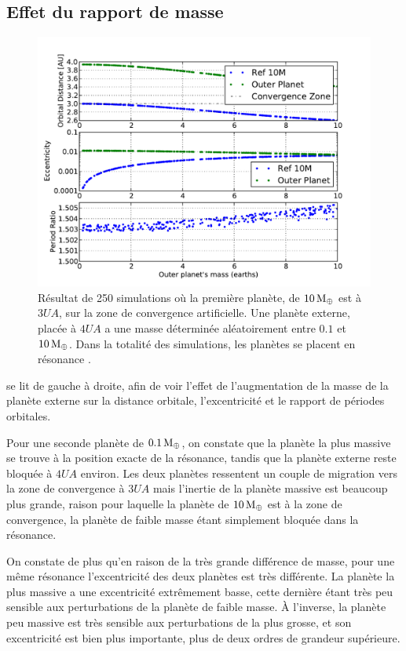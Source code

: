 \subsection{Effet du rapport de masse}
\begin{figure}[htb]
\centering
\includegraphics[width=0.75\linewidth]{figure/MMR_mass_ratio.pdf}
\caption{Résultat de 250 simulations où la première planète, de $10\mathrm{\thinspace M_\oplus}$ est à $3\unit{UA}$, sur
la zone de convergence artificielle. Une planète externe, placée à $4\unit{UA}$ a une masse
déterminée aléatoirement entre $0.1$ et $10\mathrm{\thinspace M_\oplus}$. Dans la totalité des simulations, les planètes
se placent en résonance .}\label{fig:MMR_mass_ratio}
\end{figure}

 se lit de gauche à droite, afin de voir l'effet de l'augmentation de la masse de la planète externe
sur la distance orbitale, l'excentricité et le rapport de périodes orbitales. 

Pour une seconde planète de $0.1\mathrm{\thinspace M_\oplus}$, on constate que la planète la plus massive se trouve à la position exacte de la
résonance, tandis que la planète externe reste bloquée à $4\unit{UA}$ environ. Les deux planètes ressentent un couple de
migration vers la zone de convergence à $3\unit{UA}$ mais l'inertie de la planète massive est beaucoup plus grande, raison pour
laquelle la planète de $10\mathrm{\thinspace M_\oplus}$ est à la zone de convergence, la planète de faible masse étant simplement bloquée dans la
résonance. 

On constate de plus qu'en raison de la très grande différence de masse, pour une même résonance l'excentricité des deux
planètes est très différente. La planète la plus massive a une excentricité extrêmement basse, cette dernière étant très peu
sensible aux perturbations de la planète de faible masse. À l'inverse, la planète peu massive est très sensible aux
perturbations de la plus grosse, et son excentricité est bien plus importante, plus de deux ordres de grandeur supérieure.

